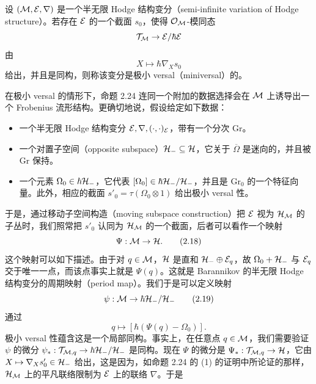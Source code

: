 
\begin{definition}
设 $(\mathcal{M},\mathcal{E},\nabla)$ 是一个半无限 Hodge 结构变分（semi-infinite variation of Hodge structure）。若存在 $\mathcal{E}$ 的一个截面 $s_0$，使得 $\mathcal{O}_{\mathcal{M}}$-模同态
\[
\mathcal{T}_{\mathcal{M}}\to\mathcal{E}/\hbar\mathcal{E}
\]
由
\[
X\longmapsto\hbar\nabla_Xs_0
\]
给出，并且是同构，则称该变分是极小 versal（miniversal）的。
\end{definition}

在极小 versal 的情形下，命题 2.24 连同一个附加的数据选择会在 $\mathcal{M}$ 上诱导出一个 Frobenius 流形结构。更确切地说，假设给定如下数据：
\begin{itemize}[leftmargin=2em]
\item 一个半无限 Hodge 结构变分 $\mathcal{E},\nabla,(\cdot,\cdot)_{\mathcal{E}}$，带有一个分次 $\mathrm{Gr}$。
\item 一个对置子空间（opposite subspace）$\mathcal{H}_-\subseteq\mathcal{H}$，它关于 $\overline{\Omega}$ 是迷向的，并且被 $\mathrm{Gr}$ 保持。
\item 一个元素 $\Omega_0\in\hbar\mathcal{H}_-$，它代表 $[\Omega_0]\in\hbar\mathcal{H}_-/\mathcal{H}_-$，并且是 $\mathrm{Gr}_0$ 的一个特征向量。此外，相应的截面 $s'_0=\tau(\Omega_0\otimes1)$ 给出极小 versal 性。
\end{itemize}
于是，通过移动子空间构造（moving subspace construction）把 $\mathcal{E}$ 视为 $\mathcal{H}_{\mathcal{M}}$ 的子丛时，我们照常把 $s'_0$ 认同为 $\mathcal{H}_{\mathcal{M}}$ 的一个截面，后者可以看作一个映射
\begin{equation}
\Psi:\mathcal{M}\to\mathcal{H}. \tag{2.18}
\end{equation}
这个映射可以如下描述。由于对 $q\in\mathcal{M}$，$\mathcal{H}$ 是直和 $\mathcal{H}_-\oplus\mathcal{E}_q$，故 $\Omega_0+\mathcal{H}_-$ 与 $\mathcal{E}_q$ 交于唯一一点，而该点事实上就是 $\Psi(q)$。这就是 Barannikov 的半无限 Hodge 结构变分的周期映射（period map）。我们于是可以定义映射
\begin{equation}
\psi:\mathcal{M}\to\hbar\mathcal{H}_-/\mathcal{H}_- \tag{2.19}
\end{equation}
通过
\[
q\longmapsto[\hbar(\Psi(q)-\Omega_0)].
\]
极小 versal 性蕴含这是一个局部同构。事实上，在任意点 $q\in\mathcal{M}$，我们需要验证 $\psi$ 的微分 $\psi_*:\mathcal{T}_{\mathcal{M},q}\to\hbar\mathcal{H}_-/\mathcal{H}_-$ 是同构。现在 $\Psi$ 的微分是 $\Psi_*:\mathcal{T}_{\mathcal{M},q}\to\mathcal{H}$，它由 $X\mapsto\nabla_Xs'_0\in\mathcal{H}_-$ 给出，这是因为，如命题 2.24 的 (1) 的证明中所论证的那样，$\mathcal{H}_{\mathcal{M}}$ 上的平凡联络限制为 $\mathcal{E}$ 上的联络 $\nabla$。于是
